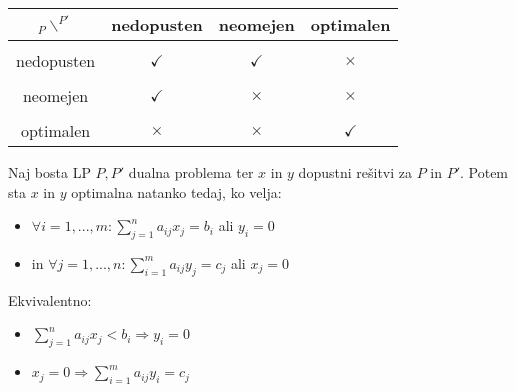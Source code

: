 \documentclass[11pt, a4paper]{article}
\begin{document}
    
    \begin{center}
        \begin{tabular}{ c|c c c }
            \(_P \backslash ^{P'}\) & nedopusten & neomejen & optimalen \\
            \hline \\
            nedopusten & \(\checkmark\) & \(\checkmark\) & \(\times\) \\
            \hline \\
            neomejen & \(\checkmark\) & \(\times\) & \(\times\) \\
            \hline \\
            optimalen & \(\times\) & \(\times\) & \(\checkmark\) \\
        \end{tabular}
    \end{center}
        

    \begin{theorem}
        Naj bosta LP \(P,P'\) dualna problema ter \(x\) in \(y\) dopustni rešitvi za \(P\) in \(P'\). Potem sta \(x\) in \(y\) optimalna natanko tedaj, ko velja:
        \begin{itemize}
            \item \(\displaystyle \forall i=1,...,m: \sum_{j=1}^n a_{ij} x_j = b_i\) ali \(y_i=0\) 
            \item in \(\displaystyle \forall j=1,...,n: \sum_{i=1}^m a_{ij} y_j = c_j\) ali \(x_j=0\)
        \end{itemize}

        Ekvivalentno:
        \begin{itemize}
            \item \(\displaystyle \sum_{j=1}^n a_{ij} x_j < b_i \Rightarrow y_i = 0\)
            \item \(\displaystyle x_j = 0 \Rightarrow \sum_{i=1}^m a_{ij} y_i = c_j\)
        \end{itemize}
    \end{theorem}
\end{document}
